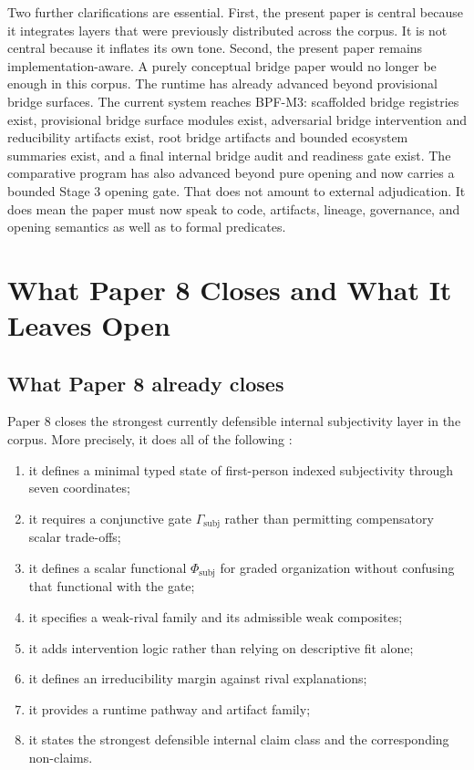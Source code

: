 \documentclass[11pt,a4paper]{article}
\theoremstyle{definition}
\newcommand{\PhiSubj}{\Phi_{\mathrm{subj}}}
\newcommand{\GateSubj}{\Gamma_{\mathrm{subj}}}
\begin{document}
Two further clarifications are essential. First, the present paper is central because it integrates layers that were previously distributed across the corpus. It is not central because it inflates its own tone. Second, the present paper remains implementation-aware. A purely conceptual bridge paper would no longer be enough in this corpus. The runtime has already advanced beyond provisional bridge surfaces. The current system reaches BPF-M3: scaffolded bridge registries exist, provisional bridge surface modules exist, adversarial bridge intervention and reducibility artifacts exist, root bridge artifacts and bounded ecosystem summaries exist, and a final internal bridge audit and readiness gate exist. The comparative program has also advanced beyond pure opening and now carries a bounded Stage 3 opening gate. That does not amount to external adjudication. It does mean the paper must now speak to code, artifacts, lineage, governance, and opening semantics as well as to formal predicates.

\section{What Paper 8 Closes and What It Leaves Open}
\subsection{What Paper 8 already closes}
Paper 8 closes the strongest currently defensible internal subjectivity layer in the corpus. More precisely, it does all of the following \cite{paper8}:
\begin{enumerate}[leftmargin=1.5em]
\item it defines a minimal typed state of first-person indexed subjectivity through seven coordinates;
\item it requires a conjunctive gate $\GateSubj$ rather than permitting compensatory scalar trade-offs;
\item it defines a scalar functional $\PhiSubj$ for graded organization without confusing that functional with the gate;
\item it specifies a weak-rival family and its admissible weak composites;
\item it adds intervention logic rather than relying on descriptive fit alone;
\item it defines an irreducibility margin against rival explanations;
\item it provides a runtime pathway and artifact family;
\item it states the strongest defensible internal claim class and the corresponding non-claims.
\end{enumerate}
\end{document}
